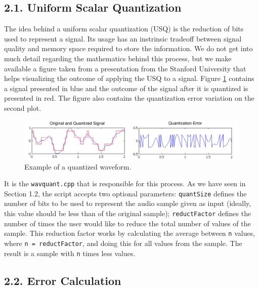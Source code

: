 \documentclass[12pt]{article}
\begin{document}
\subsection*{2.1. Uniform Scalar Quantization}

The idea behind a uniform scalar quantization (USQ) is the reduction of bits 
used to represent a signal.
Its usage has an instrinsic tradeoff between signal quality and memory space
required to store the information.
We do not get into much detail regarding the mathematics behind this process, 
but we make available a figure taken from a presentation from the Stanford 
University \cite{stanford} that helps visualizing the outcome of applying the 
USQ to a signal.
Figure \ref{fig:quantization} contains a signal presented in blue and the outcome
of the signal after it is quantized is presented in red. 
The figure also contains the quantization error variation on
the second plot.

\begin{figure}[H]
  \centering
  \begin{minipage}{\textwidth}
    \centering
    \includegraphics[width=\linewidth]{stanford_quantization_wide.png}
  \end{minipage}%
  \caption{Example of a quantized waveform.}
  \label{fig:quantization}
\end{figure}

It is the \texttt{wavquant.cpp} that is responsible for this process.
As we have seen in Section 1.2, the script accepts two optional parameters:
\texttt{quantSize} defines the number of bits to be used to represent the audio 
sample given as input (ideally, this value should be less than of the original 
sample); \texttt{reductFactor} defines the number of times the user would like 
to reduce the total number of values of the sample.
This reduction factor works by calculating the average between \texttt{n} values, 
where \texttt{n = reductFactor}, and doing this for all values from the sample.
The result is a sample with \texttt{n} times less values.



\subsection*{2.2. Error Calculation}
\end{document}
